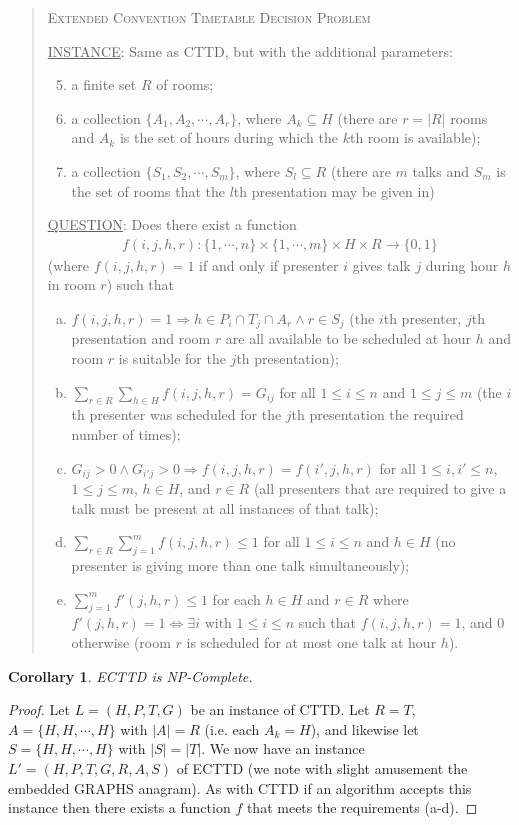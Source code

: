 \documentclass[]{article}
\newtheorem{cor}[thm]{Corollary}
\theoremstyle{definition}
\theoremstyle{remark}
\numberwithin{equation}{section}
\begin{document}
\begin{quote}
	\textsc{Extended Convention Timetable Decision Problem}
	
	\underline{INSTANCE}: Same as CTTD, but with the additional parameters:
		\begin{enumerate}[1.]
			\setcounter{enumi}{4}
			\item a finite set $R$ of rooms;
			\item a collection $\{A_1,A_2,\cdots,A_r\}$, where $A_k \subseteq H$ (there are $r=|R|$ rooms and $A_k$ is the set of hours during which the $k$th room is available);
			\item a collection $\{S_1,S_2,\cdots,S_m\}$, where $S_l \subseteq R$ (there are $m$ talks and $S_m$ is the set of rooms that the $l$th presentation may be given in)
		\end{enumerate}
	\underline{QUESTION}: Does there exist a function 
		\begin{gather*}
			f(i,j,h,r) : \{1,\cdots,n\} \times \{1,\cdots,m\} \times H \times R \rightarrow \{0,1\}
		\end{gather*}
		(where $f(i,j,h,r)=1$ if and only if presenter $i$ gives talk $j$ during hour $h$ in room $r$) such that
		\begin{enumerate}[(a)]
			\item $f(i,j,h,r) = 1 \Rightarrow h \in P_i \cap T_j \cap A_r \land r \in S_j$ (the $i$th presenter, $j$th presentation and room $r$ are all available to be scheduled at hour $h$ and room $r$ is suitable for the $j$th presentation);
			\item $\sum\limits_{r \in R}\sum\limits_{h \in H} f(i,j,h,r) = G_{ij}$ for all $1 \le i \le n$ and $1 \le j \le m$ (the $i$th presenter was scheduled for the $j$th presentation the required number of times);
			\item $G_{ij} > 0 \land G_{i'j} > 0 \Rightarrow f(i,j,h,r)=f(i',j,h,r)$ for all $1 \le i,i' \le n$, $1 \le j \le m$, $h \in H$, and $r \in R$ (all presenters that are required to give a talk must be present at all instances of that talk);
			\item $\sum\limits_{r \in R}\sum\limits_{j=1}^m f(i,j,h,r) \le 1$ for all $1 \le i \le n$ and $h \in H$ (no presenter is giving more than one talk simultaneously);
			\item $\sum\limits_{j=1}^m f'(j,h,r) \le 1$ for each $h \in H$ and $r \in R$ where $f'(j,h,r) = 1 \iff \exists i \text{ with } 1 \le i \le n$ such that $f(i,j,h,r)=1$, and 0 otherwise (room $r$ is scheduled for at most one talk at hour $h$).
		\end{enumerate}
\end{quote}
\begin{cor}
ECTTD is NP-Complete.
\end{cor}
\begin{proof}
Let $L=(H,P,T,G)$ be an instance of CTTD. Let $R=T$, $A=\{H,H,\cdots,H\}$ with $|A|=R$ (i.e. each $A_k=H$), and  likewise let $S=\{H,H,\cdots,H\}$ with $|S|=|T|$. We now have an instance $L'=(H,P,T,G,R,A,S)$ of ECTTD (we note with slight amusement the embedded GRAPHS anagram). As with CTTD if an algorithm accepts this instance then there exists a function $f$ that meets the requirements (a-d).
\end{proof}
\end{document}
